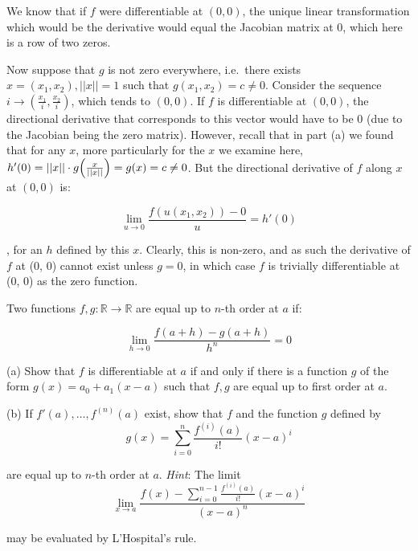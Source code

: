 \begin{solution}
    We know that if $f$ were differentiable at $(0, 0)$, the unique linear transformation which would be the derivative would equal the Jacobian matrix at 0, which here is a row of two zeros.

    Now suppose that $g$ is not zero everywhere, i.e.\ there exists $x = (x_1, x_2), \lvert \lvert x \rvert \rvert = 1$ such that $g(x_1, x_2) = c \neq 0$. Consider the sequence $i \rightarrow (\frac{x_1}{i}, \frac{x_2}{i})$, which tends to $(0, 0)$. If $f$ is differentiable at $(0, 0)$, the directional derivative that corresponds to this vector would have to be 0 (due to the Jacobian being the zero matrix). However, recall that in part (a) we found that for any $x$, more particularly for the $x$ we examine here, $h'(0) = \lvert \lvert x \rvert \rvert \cdot g\Bigl(\frac{x}{\lvert \lvert x \rvert \rvert}\Bigr) = g(x) = c \neq 0$. But the directional derivative of $f$ along $x$ at $(0, 0)$ is:

    $$\lim_{u \rightarrow 0} \frac{f(u(x_1, x_2)) - 0}{u} = h'(0)$$

    , for an $h$ defined by this $x$. Clearly, this is non-zero, and as such the derivative of $f$ at (0, 0) cannot exist unless $g = 0$, in which case $f$ is trivially differentiable at (0, 0) as the zero function.
\end{solution}

\begin{exercise}{9}
    Two functions $f, g: \mathbb{R} \rightarrow \mathbb{R}$ are equal up to $n$-th order at $a$ if:

    $$\lim_{h \rightarrow 0} \frac{f(a+h) - g(a+h)}{h^n} = 0$$

    (a) Show that $f$ is differentiable at $a$ if and only if there is a function $g$ of the form $g(x) = a_0 + a_1(x - a)$ such that $f, g$ are equal up to first order at $a$.

    (b) If $f'(a), \ldots, f^(n)(a)$ exist, show that $f$ and the function $g$ defined by
    $$g(x) = \sum_{i = 0}^{n} \frac{f^(i)(a)}{i!}(x - a)^i$$

    are equal up to $n$-th order at $a$. \textit{Hint}: The limit
    $$\lim_{x \rightarrow a} \frac{f(x) - \sum_{i = 0}^{n - 1}\frac{f^{(i)}(a)}{i!}(x-a)^i}{(x-a)^n}$$

    may be evaluated by L'Hospital's rule.
\end{exercise}

